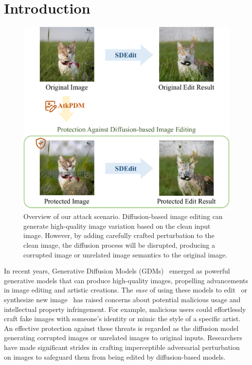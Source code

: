 \section{Introduction}

\begin{figure}[t]
    \centering
    \includegraphics[width=\linewidth]{figures/overview.pdf}
    \caption{Overview of our attack scenario. Diffusion-based image editing can generate high-quality image variation based on the clean input image. However, by adding carefully crafted perturbation to the clean image, the diffusion process will be disrupted, producing a corrupted image or unrelated image semantics to the original image.}
    \label{fig:teaser}
\end{figure}

In recent years, Generative Diffusion Models (GDMs)~\cite{ho2020denoising, song2021denoisingdiffusionimplicitmodels} emerged as powerful generative models that can produce high-quality images, propelling advancements in image editing and artistic creations. The \textit{ease} of using these models to edit~\cite{meng2021sdedit, wang2023stylediffusion, zhang2023inversion} or synthesize new image~\cite{dhariwal2021diffusion, rombach2022high} has raised concerns about potential malicious usage and intellectual property infringement. For example, malicious users could effortlessly craft fake images with someone's identity or mimic the style of a specific artist. An effective protection against these threats is regarded as the diffusion model generating corrupted images or unrelated images to original inputs. Researchers have made significant strides in crafting imperceptible adversarial perturbation on images to safeguard them from being edited by diffusion-based models. 

